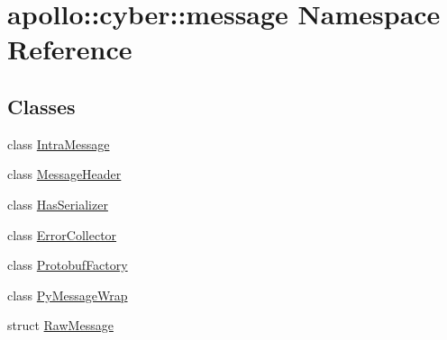\hypertarget{namespaceapollo_1_1cyber_1_1message}{\section{apollo\-:\-:cyber\-:\-:message Namespace Reference}
\label{namespaceapollo_1_1cyber_1_1message}
}
\subsection*{Classes}
\begin{DoxyCompactItemize}
\item 
class \hyperlink{classapollo_1_1cyber_1_1message_1_1IntraMessage}{Intra\-Message}
\item 
class \hyperlink{classapollo_1_1cyber_1_1message_1_1MessageHeader}{Message\-Header}
\item 
class \hyperlink{classapollo_1_1cyber_1_1message_1_1HasSerializer}{Has\-Serializer}
\item 
class \hyperlink{classapollo_1_1cyber_1_1message_1_1ErrorCollector}{Error\-Collector}
\item 
class \hyperlink{classapollo_1_1cyber_1_1message_1_1ProtobufFactory}{Protobuf\-Factory}
\item 
class \hyperlink{classapollo_1_1cyber_1_1message_1_1PyMessageWrap}{Py\-Message\-Wrap}
\item 
struct \hyperlink{structapollo_1_1cyber_1_1message_1_1RawMessage}{Raw\-Message}
\end{DoxyCompactItemize}
